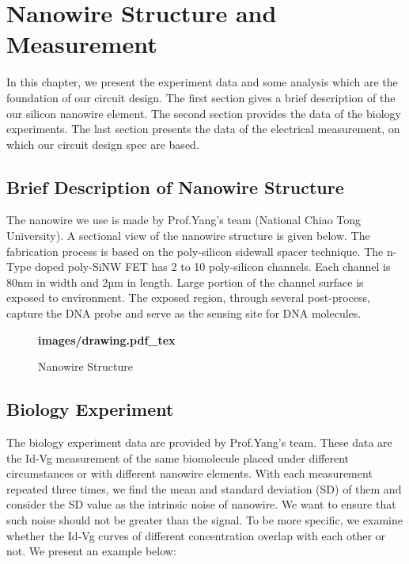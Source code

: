 \chapter{Nanowire Structure and Measurement}
In this chapter, we present the experiment data and some analysis which are the foundation of our circuit design.
The first section gives a brief description of the our silicon nanowire element.
The second section provides the data of the biology experiments.
The last section presents the data of the electrical measurement, on which our circuit design spec are based.

\section{Brief Description of Nanowire Structure}
The nanowire we use is made by Prof.Yang's team (National Chiao Tong University)\cite{C5}.
A sectional view of the nanowire structure is given below.
The fabrication process is based on the poly-silicon sidewall spacer technique.
The n-Type doped poly-SiNW FET has 2 to 10 poly-silicon channels.
Each channel is 80nm in width and 2µm in length.
Large portion of the channel surface is exposed to environment.
The exposed region, through several post-process, capture the DNA probe and serve as the sensing site for DNA molecules.\cite{C5, C6}

\begin{figure}[!htbp]
    \centering
    {\selectfont\textbf{
        \def\svgwidth{5.0cm}
        \fontsize{6}{7}\selectfont
         {images/drawing.pdf_tex}
    }}
    \fontsize{6}{7}\selectfont
    \caption{Nanowire Structure}
    \label{fig:drawing}
\end{figure}


\section{Biology Experiment}
The biology experiment data are provided by Prof.Yang's team.
These data are the Id-Vg measurement of the same biomolecule placed under different circumstances or with different nanowire elements.
With each measurement repeated three times, we find the mean and standard deviation (SD) of them and consider the SD value as the intrinsic noise of nanowire.
We want to ensure that such noise should not be greater than the signal.
To be more specific, we examine whether the Id-Vg curves of different concentration overlap with each other or not.
We present an example below:



